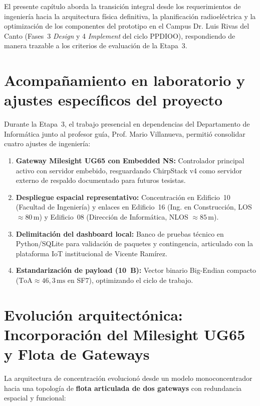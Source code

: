 \documentclass[12pt,oneside,openany,spanish,oldfontcommands]{memoir}
\begin{document}
El presente capítulo aborda la transición integral desde los requerimientos de ingeniería hacia la
arquitectura física definitiva, la planificación radioeléctrica y la optimización de los componentes
del prototipo en el Campus Dr. Luis Rivas del Canto (Fases~3 \textit{Design} y 4 \textit{Implement}
del ciclo PPDIOO), respondiendo de manera trazable a los criterios de evaluación de la Etapa~3.

\section{Acompañamiento en laboratorio y ajustes específicos del proyecto}\label{sec:acompanamiento-ajustes}

Durante la Etapa~3, el trabajo presencial en dependencias del Departamento de Informática junto al profesor guía, Prof. Mario Villanueva, permitió consolidar cuatro ajustes de ingeniería:
\begin{enumerate}
    \item \textbf{Gateway Milesight UG65 con Embedded NS:} Controlador principal activo con servidor embebido, resguardando ChirpStack v4 como servidor externo de respaldo documentado para futuros tesistas.
    \item \textbf{Despliegue espacial representativo:} Concentración en Edificio~10 (Facultad de Ingeniería) y enlaces en Edificio~16 (Ing. en Construcción, LOS $\approx 80\,\text{m}$) y Edificio~08 (Dirección de Informática, NLOS $\approx 85\,\text{m}$).
    \item \textbf{Delimitación del dashboard local:} Banco de pruebas técnico en Python/SQLite para validación de paquetes y contingencia, articulado con la plataforma IoT institucional de Vicente Ramírez.
    \item \textbf{Estandarización de payload (10~B):} Vector binario Big-Endian compacto ($\text{ToA} \approx 46,3\,\text{ms}$ en SF7), optimizando el ciclo de trabajo.
\end{enumerate}

\section{Evolución arquitectónica: Incorporación del Milesight UG65 y Flota de Gateways}\label{sec:justificacion-ug65}

La arquitectura de concentración evolucionó desde un modelo monoconcentrador hacia una
topología de \textbf{flota articulada de dos gateways} con redundancia espacial y funcional:
\end{document}
